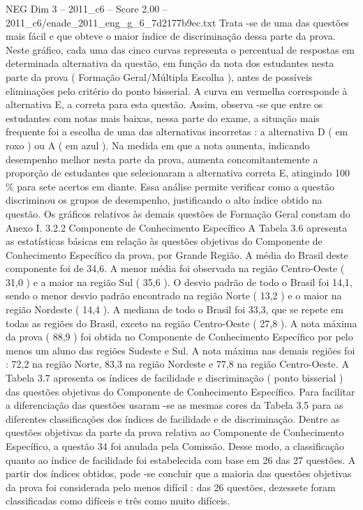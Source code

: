 \begin{textsample}{NEG Dim 3 – 2011\_c6 – Score 2.00 – 2011\_c6/enade\_2011\_eng\_g\_6\_7d2177b9ec.txt}
Trata -se de uma das questões mais fácil e que obteve o maior índice de discriminação dessa parte da prova.
Neste gráfico, cada uma das cinco curvas representa o percentual de respostas em determinada alternativa da questão, em função da nota dos estudantes nesta parte da prova ( Formação Geral/Múltipla Escolha ), antes de possíveis eliminações pelo critério do ponto bisserial.
A curva em vermelha corresponde à alternativa E, a correta para esta questão.
Assim, observa -se que entre os estudantes com notas mais baixas, nessa parte do exame, a situação mais frequente foi a escolha de uma das alternativas incorretas : a alternativa D ( em roxo ) ou A ( em azul ).
Na medida em que a nota aumenta, indicando desempenho melhor nesta parte da prova, aumenta concomitantemente a proporção de estudantes que selecionaram a alternativa correta E, atingindo 100 \% para sete acertos em diante.
Essa análise permite verificar como a questão discriminou os grupos de desempenho, justificando o alto índice obtido na questão.
Os gráficos relativos às demais questões de Formação Geral constam do Anexo I. 3.2.2 Componente de Conhecimento Específico A Tabela 3.6 apresenta as estatísticas básicas em relação às questões objetivas do Componente de Conhecimento Específico da prova, por Grande Região.
A média do Brasil deste componente foi de 34,6.
A menor média foi observada na região Centro-Oeste ( 31,0 ) e a maior na região Sul ( 35,6 ).
O desvio padrão de todo o Brasil foi 14,1, sendo o menor desvio padrão encontrado na região Norte ( 13,2 ) e o maior na região Nordeste ( 14,4 ).
A mediana de todo o Brasil foi 33,3, que se repete em todas as regiões do Brasil, exceto na região Centro-Oeste ( 27,8 ).
A nota máxima da prova ( 88,9 ) foi obtida no Componente de Conhecimento Específico por pelo menos um aluno das regiões Sudeste e Sul.
A nota máxima nas demais regiões foi : 72,2 na região Norte, 83,3 na região Nordeste e 77,8 na região Centro-Oeste.
A Tabela 3.7 apresenta os índices de facilidade e discriminação ( ponto bisserial ) das questões objetivas do Componente de Conhecimento Específico.
Para facilitar a diferenciação das questões usaram -se as mesmas cores da Tabela 3.5 para as diferentes classificações dos índices de facilidade e de discriminação.
Dentre as questões objetivas da parte da prova relativa ao Componente de Conhecimento Específico, a questão 34 foi anulada pela Comissão.
Desse modo, a classificação quanto ao índice de facilidade foi estabelecida com base em 26 das 27 questões.
A partir dos índices obtidos, pode -se concluir que a maioria das questões objetivas da prova foi considerada pelo menos difícil : das 26 questões, dezessete foram classificadas como difíceis e três como muito difíceis.

\end{textsample}
